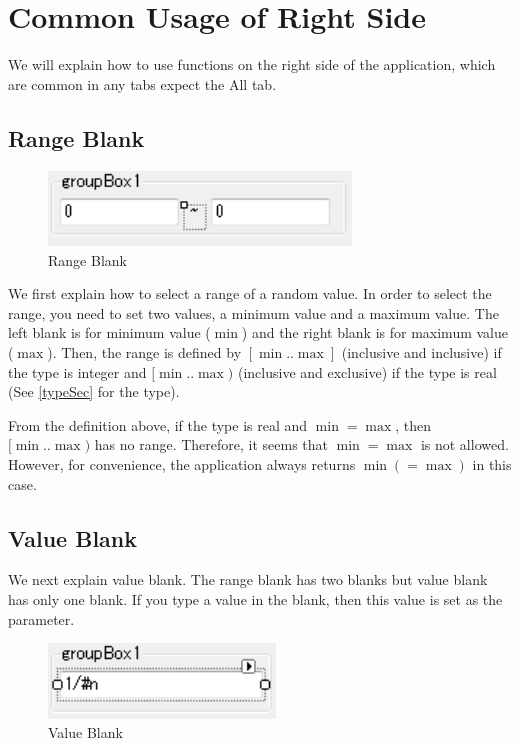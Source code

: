 \documentclass{article}
\begin{document}
\newpage


\section{Common Usage of Right Side}\label{commonRightSec}
We will explain how to use functions on the right side of the application,
which are common in any tabs expect the All tab.

\subsection{Range Blank}
\begin{figure}[h!]\label{rangeFormPic}
{
\fontsize{10pt}{12pt}\selectfont
\centering
\includegraphics[height=2.0cm]{picture/rangeForm.png}
\caption{Range Blank}
}
\end{figure}
We first explain how to select a range of a random value.
In order to select the range,
you need to set two values, a minimum value and a maximum value.
The left blank is for minimum value ($\min$)
and the right blank is for maximum value ($\max$).
Then, the range is defined by $[\min..\max]$ (inclusive and inclusive) if the type is integer
and $[\min..\max)$ (inclusive and exclusive) if the type is real (See \ref{typeSec} for the type).

From the definition above,
if the type is real and $\min=\max$,
then $[\min..\max)$ has no range.
Therefore, it seems that $\min=\max$ is not allowed.
However, for convenience, the application always returns $\min (=\max)$ in this case.


\subsection{Value Blank}
We next explain value blank.
The range blank has two blanks but value blank has only one blank.
If you type a value in the blank,
then this value is set as the parameter.

\begin{figure}[h!]\label{valueFormPic}
{
\fontsize{10pt}{12pt}\selectfont
\centering
\includegraphics[height=2.0cm]{picture/valueForm.png}
\caption{Value Blank}
}
\end{figure}
\end{document}
